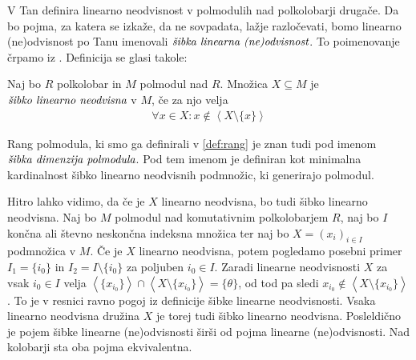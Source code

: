 \documentclass[mat1]{fmfdelo}
\newcommand{\pojem}[1]{\ensuremath{\emph{#1}}}
\newcommand{\Gen}[1]{\ensuremath{\left<{#1}\right>}}
\begin{document}
V \cite[definicija 2.\,3.\,]{bib:Tanbase} Tan definira linearno neodvisnost v polmodulih nad polkolobarji drugače. Da bo pojma, za katera se izkaže, da ne sovpadata, lažje razločevati, bomo linearno (ne)odvisnost po Tanu imenovali \pojem{šibka linearna (ne)odvisnost}. To poimenovanje črpamo iz \cite[definicija 2. 12.]{bib:AkianTropSemi}. Definicija se glasi takole:
\begin{definicija}\label{def:linneodv2}
	Naj bo $R$ polkolobar in $M$ polmodul nad $R$. Množica $X\subseteq M$ je \pojem{šibko linearno neodvisna} v $M$, če za njo velja
\begin{align*}
	\forall x\in X: x \notin \Gen{X\setminus\{x\}}
\end{align*}
\end{definicija}
\begin{opomba}
	 Rang polmodula, ki smo ga definirali v \ref{def:rang} je znan tudi pod imenom \pojem{šibka dimenzija polmodula}. Pod tem imenom je definiran kot minimalna kardinalnost šibko linearno neodvisnih podmnožic, ki generirajo polmodul.
\end{opomba}
Hitro lahko vidimo, da če je $X$ linearno neodvisna, bo tudi šibko linearno neodvisna. Naj bo $M$ polmodul nad komutativnim polkolobarjem $R$, naj bo $I$ končna ali števno neskončna indeksna množica ter naj bo $X = (x_i)_{i\in I}$ podmnožica v $M$. 
Če je $X$ linearno neodvisna, potem pogledamo posebni primer $I_1 = \{i_0\}$ in $I_2 = I\setminus\{i_0\}$ za poljuben $i_0\in I$. Zaradi linearne neodvisnosti $X$ za vsak $i_0 \in I$ velja $\Gen{\{x_{i_0}\}}\cap \Gen{X\setminus\{x_{i_0}\}} = \{\theta\}$, od tod pa sledi $x_{i_0}\notin \Gen{X\setminus\{x_{i_0}\}}$. To je v resnici ravno pogoj iz definicije šibke linearne neodvisnosti. Vsaka linearno neodvisna družina $X$ je torej tudi šibko linearno neodvisna. Posleldično je pojem šibke linearne (ne)odvisnosti širši od pojma linearne (ne)odvisnosti. Nad kolobarji sta oba pojma ekvivalentna.
\end{document}
